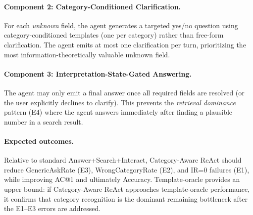 \paragraph{Component 2: Category-Conditioned Clarification.}
For each \emph{unknown} field, the agent generates a targeted yes/no question
using category-conditioned templates (one per category) rather than free-form
clarification.
The agent emits at most one clarification per turn, prioritizing the most
information-theoretically valuable unknown field.

\paragraph{Component 3: Interpretation-State-Gated Answering.}
The agent may only emit a final answer once all required fields are resolved
(or the user explicitly declines to clarify).
This prevents the \emph{retrieval dominance} pattern (E4) where the agent
answers immediately after finding a plausible number in a search result.

\paragraph{Expected outcomes.}
Relative to standard Answer+Search+Interact, Category-Aware ReAct should reduce
GenericAskRate (E3), WrongCategoryRate (E2), and IR=0 failures (E1), while
improving AC@1 and ultimately Accuracy.
Template-oracle provides an upper bound: if Category-Aware ReAct approaches
template-oracle performance, it confirms that category recognition is the dominant
remaining bottleneck after the E1--E3 errors are addressed.

